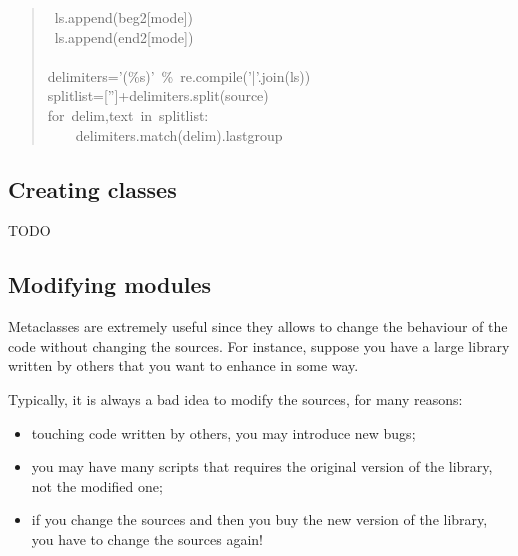 \documentclass[10pt,english]{article}
\begin{document}
\begin{quote}
\begin{ttfamily}
\begin{flushleft}
\mbox{~ls.append(beg2[mode])}\\
\mbox{~ls.append(end2[mode])}\\
\mbox{}\\
\mbox{delimiters='({\%}s)'~{\%}~re.compile('|'.join(ls))}\\
\mbox{splitlist=['']+delimiters.split(source)}\\
\mbox{for~delim,text~in~splitlist:}\\
\mbox{~~~~delimiters.match(delim).lastgroup}
\end{flushleft}\end{ttfamily}
\end{quote}



\hypertarget{creating-classes}{}
\subsection*{Creating classes}

TODO



\hypertarget{modifying-modules}{}
\subsection*{Modifying modules}

Metaclasses are extremely
useful since they allows to change the behaviour of the code without
changing the sources. For instance, suppose you have a large library written 
by others that you want to enhance in some way.

Typically, it is always a bad idea to modify the sources, for many reasons:
\begin{itemize}
\item {} 
touching code written by others, you may introduce new bugs;

\item {} 
you may have many scripts that requires the original version 
of the library, not the modified one;

\item {} 
if you change the sources and then you buy the new version of the
library, you have to change the sources again!

\end{itemize}
\end{document}
